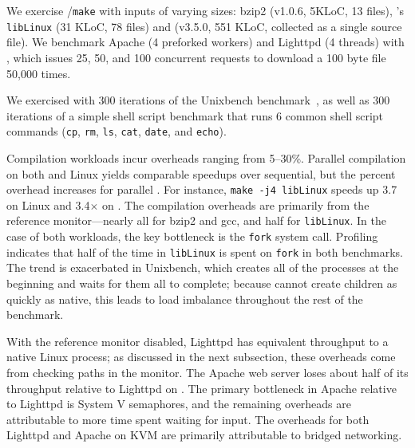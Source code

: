 We exercise  {\tt \gcc{}}/{\tt make}
with inputs of varying sizes:
bzip2 (v1.0.6, 5KLoC, 13 files),
\graphene{}'s {\tt libLinux} (31 KLoC, 78 files)
and \gcc{} (v3.5.0, 551 KLoC, collected as a single source file). 
We benchmark Apache (4 preforked workers) and Lighttpd (4 threads) with 
\ab{},
which issues 25, 50, and 100 concurrent requests
to download a 100 byte file 50,000 times.

We exercised \busy{} with 
300 iterations of the Unixbench benchmark~\citep{unixbench}, as well as 
300 iterations of a simple shell script benchmark that runs 6 common shell script commands
({\tt cp}, {\tt rm}, {\tt ls}, {\tt cat}, {\tt date}, and {\tt echo}).

Compilation workloads incur overheads ranging from 5--30\%.
Parallel compilation on both \graphene{} and Linux yields comparable  speedups  over sequential,
but the percent overhead increases for parallel \graphene{}.
For instance, {\tt make -j4 libLinux} speeds up 3.7\x{} on Linux and 3.4$\times$ on \graphene{}.
The compilation overheads are primarily from the reference monitor---nearly all for bzip2 and gcc, and half for {\tt libLinux}.
In the case of both \busy{} workloads, the key bottleneck is the {\tt fork} system call.
Profiling indicates that half of the time in {\tt libLinux} is spent on {\tt fork} in both benchmarks.
The trend is exacerbated in Unixbench, which creates all of the processes at the beginning and
waits for them all to complete; because \graphene{} cannot create children as quickly as native, this leads to 
load imbalance throughout the rest of the benchmark.  

With the reference monitor disabled,  Lighttpd has equivalent throughput to a native Linux process;
as discussed in the next subsection, these overheads come from checking paths in the monitor.
The Apache web server loses about half of its throughput relative to Lighttpd on \graphene{}.
The primary bottleneck in Apache relative to Lighttpd is System V semaphores,
and the remaining overheads are attributable to more time spent waiting for input.
The overheads for both Lighttpd and Apache on KVM are primarily attributable
to bridged networking.


